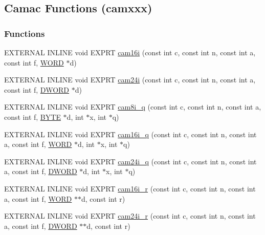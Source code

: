 \subsection{Camac Functions (camxxx)}
\label{group__mcstdfunctionh}
\subsubsection*{Functions}
\begin{DoxyCompactItemize}
\item 
EXTERNAL INLINE void EXPRT \hyperlink{group__mcstdfunctionh_gad17f339ee8254f1aad6b406e50ebd4a8}{cam16i} (const int c, const int n, const int a, const int f, \hyperlink{vt2_8h_a2b0e863dadf920709ec53d9088ee7c91}{WORD} $\ast$d)
\item 
EXTERNAL INLINE void EXPRT \hyperlink{group__mcstdfunctionh_ga84d45a99ef748664e1eead0a5da4d862}{cam24i} (const int c, const int n, const int a, const int f, \hyperlink{vt2_8h_a798af1e30bc65f319c1a246cecf59e39}{DWORD} $\ast$d)
\item 
EXTERNAL INLINE void EXPRT \hyperlink{group__mcstdfunctionh_gad21ad710943e2ab5df6f8e609afeebfe}{cam8i\_\-q} (const int c, const int n, const int a, const int f, \hyperlink{vt2_8h_a4ae1dab0fb4b072a66584546209e7d58}{BYTE} $\ast$d, int $\ast$x, int $\ast$q)
\item 
EXTERNAL INLINE void EXPRT \hyperlink{group__mcstdfunctionh_ga2a515796e8020af32ea0e5aad490a170}{cam16i\_\-q} (const int c, const int n, const int a, const int f, \hyperlink{vt2_8h_a2b0e863dadf920709ec53d9088ee7c91}{WORD} $\ast$d, int $\ast$x, int $\ast$q)
\item 
EXTERNAL INLINE void EXPRT \hyperlink{group__mcstdfunctionh_ga0f1b4435d6f1fea0e5787a5c2388b41c}{cam24i\_\-q} (const int c, const int n, const int a, const int f, \hyperlink{vt2_8h_a798af1e30bc65f319c1a246cecf59e39}{DWORD} $\ast$d, int $\ast$x, int $\ast$q)
\item 
EXTERNAL INLINE void EXPRT \hyperlink{group__mcstdfunctionh_ga2c3c3cdd300fee9d03e3c426dad38e7c}{cam16i\_\-r} (const int c, const int n, const int a, const int f, \hyperlink{vt2_8h_a2b0e863dadf920709ec53d9088ee7c91}{WORD} $\ast$$\ast$d, const int r)
\item 
EXTERNAL INLINE void EXPRT \hyperlink{group__mcstdfunctionh_gafe207e922a73f0b30e290e830808ec61}{cam24i\_\-r} (const int c, const int n, const int a, const int f, \hyperlink{vt2_8h_a798af1e30bc65f319c1a246cecf59e39}{DWORD} $\ast$$\ast$d, const int r)
\item 

\end{DoxyCompactItemize}
